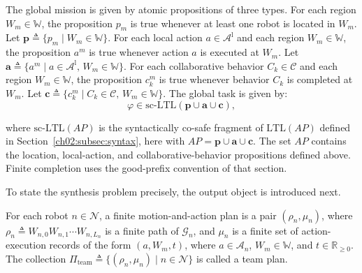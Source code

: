 The global mission is given by atomic propositions of three types. For each
region $W_{m} \in \mathbb{W}$, the proposition $p_{m}$ is true whenever at
least one robot is located in $W_{m}$. Let
$\mathbf{p} \triangleq \{p_{m} \mid W_{m} \in \mathbb{W}\}$. For each local
action $a \in \mathcal{A}^{\mathrm{l}}$ and each region
$W_{m} \in \mathbb{W}$, the proposition $a^{m}$ is true whenever action $a$ is
executed at $W_{m}$. Let
$\mathbf{a} \triangleq \{a^{m} \mid a \in \mathcal{A}^{\mathrm{l}},
\, W_{m} \in \mathbb{W}\}$. For each collaborative behavior
$C_{k} \in \mathcal{C}$ and each region $W_{m} \in \mathbb{W}$, the proposition
$c_{k}^{m}$ is true whenever behavior $C_{k}$ is completed at $W_{m}$. Let
$\mathbf{c} \triangleq \{c_{k}^{m} \mid C_{k} \in \mathcal{C},
\, W_{m} \in \mathbb{W}\}$.
The global task is given by:
\begin{equation}
\label{ch04:eq:global_task}
\varphi \in \mathrm{sc\mbox{-}LTL}(\mathbf{p} \cup \mathbf{a} \cup \mathbf{c}),
\end{equation}
\begin{revision}
where $\mathrm{sc\mbox{-}LTL}(AP)$ is the syntactically co-safe fragment
of $\mathrm{LTL}(AP)$ defined in Section~\ref{ch02:subsec:syntax},
here with $AP=\mathbf{p}\cup\mathbf{a}\cup\mathbf{c}$.
The set $AP$ contains the location, local-action, and collaborative-behavior
propositions defined above.
Finite completion uses the good-prefix convention of that section.
\end{revision}
To state the synthesis problem precisely, the output object is introduced next.

\begin{definition}
\label{ch04:def:team_plan}
For each robot $n \in \mathcal{N}$, a finite motion-and-action plan is a pair
$(\rho_{n}, \mu_{n})$, where $\rho_{n} \triangleq
W_{n,0} W_{n,1} \cdots W_{n,L_{n}}$ is a finite path of $\mathcal{G}_{n}$, and
$\mu_{n}$ is a finite set of action-execution records of the form
$(a, W_{m}, t)$, where $a \in \mathcal{A}_{n}$,
$W_{m} \in \mathbb{W}$, and $t \in \mathbb{R}_{\ge 0}$. The collection
$\Pi_{\mathrm{team}} \triangleq
\{(\rho_{n}, \mu_{n}) \mid n \in \mathcal{N}\}$ is called a team plan.
\end{definition}

